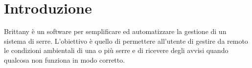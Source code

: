 \section{Introduzione}
Brittany è un software per semplificare ed automatizzare la gestione di un sistema di serre. L'obiettivo è quello di permettere all'utente di gestire da remoto le condizioni ambientali di una o più serre e di ricevere degli avvisi quando qualcosa non funziona in modo corretto.